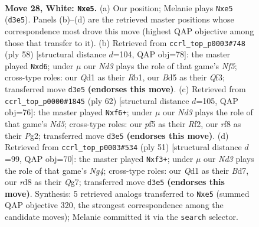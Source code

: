 \documentclass[11pt]{article}
\begin{document}
\clearpage

\begin{figure}[p]\centering
\begin{subfigure}{0.46\textwidth}\centering
\resizebox{\linewidth}{!}{%
\newchessgame
\chessboard[
  setfen={3rqr1k/6b1/1p6/p1pBnpn1/2P2R2/1P1N3p/PB1P4/1R1Q2K1 w - - 0 28},
  showmover=false,
  pgfstyle=straightmove, color=movearrow, markmove={d3-e5}
]}
\caption{}
\end{subfigure}\hfill
\begin{subfigure}{0.46\textwidth}\centering
\resizebox{\linewidth}{!}{%
\newchessgame
\chessboard[
  setfen={1r1q2rk/5pb1/p2p1n1p/2pP1N2/Pp2BB1P/1P3Q2/4P3/1R3K2 w - - 7 30},
  showmover=false,
  pgfstyle=straightmove, color=movearrow, markmove={f5-d6}
]}
\caption{}
\end{subfigure}
\\[4pt]
\begin{subfigure}{0.46\textwidth}\centering
\resizebox{\linewidth}{!}{%
\newchessgame
\chessboard[
  setfen={5rk1/8/3p1npp/1p1N1pb1/1Pr4q/P6P/1B3RP1/3R1Q1K w - - 2 32},
  showmover=false,
  pgfstyle=straightmove, color=movearrow, markmove={d5-f6}
]}
\caption{}
\end{subfigure}\hfill
\begin{subfigure}{0.46\textwidth}\centering
\resizebox{\linewidth}{!}{%
\newchessgame
\chessboard[
  setfen={r3k3/2bb2q1/P1p1p2r/2Pp2n1/3P1NPp/4PB2/1BQ5/R4RK1 b q - 0 26},
  showmover=false,
  pgfstyle=straightmove, color=movearrow, markmove={g5-f3}
]}
\caption{}
\end{subfigure}
\caption{\textbf{Move 28, White: \texttt{Nxe5}.} (a) Our position; Melanie plays \texttt{Nxe5} (\texttt{d3e5}). Panels (b)--(d) are the retrieved master positions whose correspondence most drove this move (highest QAP objective among those that transfer to it). (b) Retrieved from \texttt{ccrl\_top\_p0003\#748} (ply 58) [structural distance $d$=104, QAP obj=78]: the master played \texttt{Nxd6}; under $\mu$ our \emph{Nd3} plays the role of that game's \emph{Nf5}; cross-type roles: our \emph{Q}d1 as their \emph{R}b1, our \emph{B}d5 as their \emph{Q}f3; transferred move \texttt{d3e5} \textbf{(endorses this move)}. (c) Retrieved from \texttt{ccrl\_top\_p0000\#1845} (ply 62) [structural distance $d$=105, QAP obj=76]: the master played \texttt{Nxf6+}; under $\mu$ our \emph{Nd3} plays the role of that game's \emph{Nd5}; cross-type roles: our \emph{p}f5 as their \emph{R}f2, our \emph{r}f8 as their \emph{P}g2; transferred move \texttt{d3e5} \textbf{(endorses this move)}. (d) Retrieved from \texttt{ccrl\_top\_p0003\#534} (ply 51) [structural distance $d$=99, QAP obj=70]: the master played \texttt{Nxf3+}; under $\mu$ our \emph{Nd3} plays the role of that game's \emph{Ng4}; cross-type roles: our \emph{Q}d1 as their \emph{B}d7, our \emph{r}d8 as their \emph{Q}g7; transferred move \texttt{d3e5} \textbf{(endorses this move)}. Synthesis: 5 retrieved analogs transferred to \texttt{Nxe5} (summed QAP objective 320, the strongest correspondence among the candidate moves); Melanie committed it via the \texttt{search} selector.}
\label{fig:thought-m54}
\end{figure}
\end{document}
